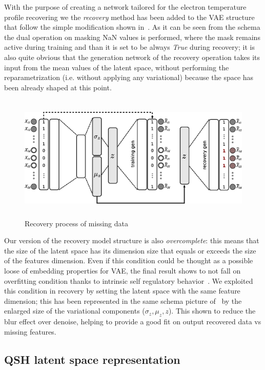 With the purpose of creating a network tailored for the electron temperature profile recovering we the \textit{recovery} method has been added to the VAE structure that follow the simple modification shown in~\Figure{\ref{fig:VAE_recovery}}.
As it can be seen from the schema the dual operation on masking NaN values is performed, where the mask remains active during training and than it is set to be always \textit{True} during recovery; it is also quite obvious that the generation network of the recovery operation takes its input from the mean values of the latent space, without performing the reparametrization (i.e. without applying any variational) because the space has been already shaped at this point.
%
\begin{figure}
    \centering
    \includegraphics[height=6cm]{img/STEP7_CLEAN/VAE_CLEAN.eps}
    \caption{Recovery process of missing data}
    \label{fig:VAE_recovery}
\end{figure}
%
Our version of the recovery model structure is also \textit{overcomplete}: this means that the size of the latent space has its dimension size that equals or exceeds the size of the features dimension. Even if this condition could be thought as a possible loose of embedding properties for VAE, the final result shows to not fall on overfitting condition thanks to intrinsic self regulatory behavior~\cite{dai2017hidden}. We exploited this condition in recovery by setting the latent space with the same feature dimension; this has been represented in the same schema picture of~\Figure{\ref{fig:VAE_recovery}} by the enlarged size of the variational components ($\sigma_z, \mu_z, z$). This shown to reduce the blur effect over denoise, helping to provide a good fit on output recovered data vs missing features.


                   

\subsection{QSH latent space representation}

